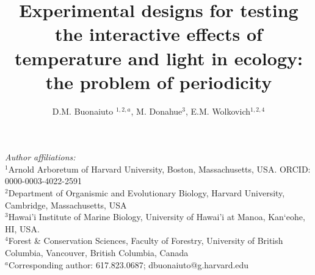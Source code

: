 \documentclass[11pt]{article}
\title{Experimental designs for testing the interactive effects of temperature and light in ecology: the problem of periodicity }
\date{}
\author{D.M. Buonaiuto $^{1,2,a}$, M. Donahue$^{3}$, E.M. Wolkovich$^{1,2,4}$}
\begin{document}
\maketitle
\noindent \emph{Author affiliations:}\\
\noindent $^1$Arnold Arboretum of Harvard University, Boston, Massachusetts, USA. ORCID: 0000-0003-4022-2591\\
$^2$Department of Organismic and Evolutionary Biology, Harvard University, Cambridge, Massachusetts, USA \\
$^3$Hawai'i Institute of Marine Biology, University of Hawai'i at Manoa, Kan‘eohe, HI, USA.\\
$^4$Forest \& Conservation Sciences, Faculty of Forestry, University of British Columbia, Vancouver, British Columbia, Canada\\
$^a$Corresponding author: 617.823.0687; dbuonaiuto@g.harvard.edu\\
\pagebreak
\maketitle
\end{document}
